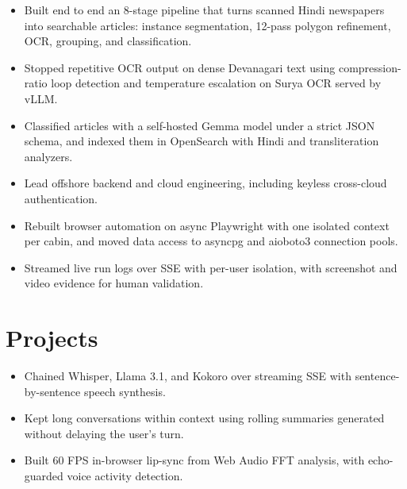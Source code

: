 \documentclass[10pt,a4paper]{article}
\begin{document}
\begin{itemize}
  \item Built end to end an 8-stage pipeline that turns scanned Hindi newspapers into searchable articles: instance segmentation, 12-pass polygon refinement, OCR, grouping, and classification.
  \item Stopped repetitive OCR output on dense Devanagari text using compression-ratio loop detection and temperature escalation on Surya OCR served by vLLM.
  \item Classified articles with a self-hosted Gemma model under a strict JSON schema, and indexed them in OpenSearch with Hindi and transliteration analyzers.
\end{itemize}

\begin{itemize}
  \item Lead offshore backend and cloud engineering, including keyless cross-cloud authentication.
\end{itemize}

\vspace{4pt}

\begin{itemize}
  \item Rebuilt browser automation on async Playwright with one isolated context per cabin, and moved data access to asyncpg and aioboto3 connection pools.
  \item Streamed live run logs over SSE with per-user isolation, with screenshot and video evidence for human validation.
\end{itemize}

\section{Projects}
\begin{itemize}
  \item Chained Whisper, Llama 3.1, and Kokoro over streaming SSE with sentence-by-sentence speech synthesis.
  \item Kept long conversations within context using rolling summaries generated without delaying the user's turn.
  \item Built 60 FPS in-browser lip-sync from Web Audio FFT analysis, with echo-guarded voice activity detection.
\end{itemize}
\end{document}
